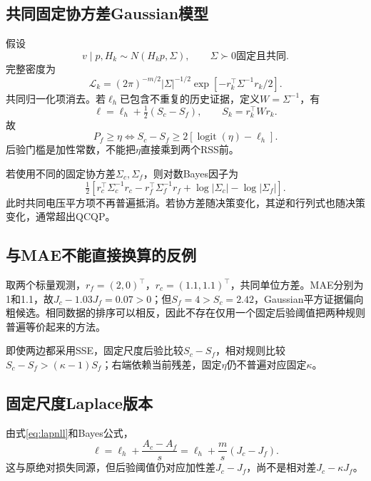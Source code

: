 \documentclass[UTF8,11pt,a4paper,fontset=fandol]{ctexart}
\newcommand{\logit}{\operatorname{logit}}
\numberwithin{equation}{section}
\begin{document}
\subsection{共同固定协方差Gaussian模型}
假设
\begin{equation}
v\mid p,H_k\sim N(H_kp,\Sigma),\qquad \Sigma\succ0\text{固定且共同}.
\end{equation}
完整密度为
\begin{equation}
\mathcal L_k=(2\pi)^{-m/2}|\Sigma|^{-1/2}
\exp[-r_k^\top\Sigma^{-1}r_k/2].
\end{equation}
共同归一化项消去。若$\ell_h$已包含不重复的历史证据，定义$W=\Sigma^{-1}$，有
\begin{equation}
\ell=\ell_h+\tfrac12(S_c-S_f),\qquad S_k=r_k^\top Wr_k.
\label{eq:fixedodds}
\end{equation}
故
\begin{equation}
\boxed{P_f\ge\eta\iff S_c-S_f\ge2[\logit(\eta)-\ell_h].}
\label{eq:fixedgate}
\end{equation}
后验门槛是加性常数，不能把$\eta$直接乘到两个RSS前。

若使用不同的固定协方差$\Sigma_c,\Sigma_f$，则对数Bayes因子为
\begin{equation}
\tfrac12\left[r_c^\top\Sigma_c^{-1}r_c-r_f^\top\Sigma_f^{-1}r_f
+\log|\Sigma_c|-\log|\Sigma_f|\right].
\end{equation}
此时共同电压平方项不再普遍抵消。若协方差随决策变化，其逆和行列式也随决策变化，通常超出QCQP。

\subsection{与MAE不能直接换算的反例}
取两个标量观测，$r_f=(2,0)^\top$，$r_c=(1.1,1.1)^\top$，共同单位方差。MAE分别为1和1.1，故$J_c-1.03J_f=0.07>0$；但$S_f=4>S_c=2.42$，Gaussian平方证据偏向粗候选。相同数据的排序可以相反，因此不存在仅用一个固定后验阈值把两种规则普遍等价起来的方法。

即使两边都采用SSE，固定尺度后验比较$S_c-S_f$，相对规则比较$S_c-S_f>(\kappa-1)S_f$；右端依赖当前残差，固定$\eta$仍不普遍对应固定$\kappa$。

\subsection{固定尺度Laplace版本}
由式\eqref{eq:lapnll}和Bayes公式，
\begin{equation}
\ell=\ell_h+\frac{A_c-A_f}{s}
=\ell_h+\frac{m}{s}(J_c-J_f).
\end{equation}
这与原绝对损失同源，但后验阈值仍对应加性差$J_c-J_f$，尚不是相对差$J_c-\kappa J_f$。
\end{document}
